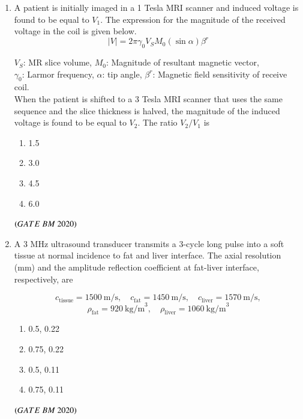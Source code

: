 \documentclass[journal,12pt,onecolumn]{IEEEtran}
\theoremstyle{remark}
\begin{document}
\begin{enumerate}
\item A patient is initially imaged in a 1 Tesla MRI scanner and induced voltage is found 
to be equal to $V_1$. The expression for the magnitude of the received voltage in the 
coil is given below.
\[
|V| = 2 \pi \gamma_0 V_S M_0 (\sin \alpha) \beta^r
\]
  
$V_S$: MR slice volume,
$M_0$: Magnitude of resultant magnetic vector,\\
$\gamma_0$: Larmor frequency,  
$\alpha$: tip angle,  
$\beta^r$: Magnetic field sensitivity of receive coil.  \\

When the patient is shifted to a 3 Tesla MRI scanner that uses the same sequence 
and the slice thickness is halved, the magnitude of the induced voltage is found 
to be equal to $V_2$. The ratio $V_2/V_1$ is
\begin{enumerate}[label=\alph*)] 
\item\hspace{0.5cm}1.5
\item\hspace{0.5cm}3.0
\item\hspace{0.5cm}4.5
\item\hspace{0.5cm}6.0
\end{enumerate}
 \hfill $\left(GATE\ BM\ 2020\right)$\\
 
\item A 3 MHz ultrasound transducer transmits a 3-cycle long pulse into a soft tissue at 
normal incidence to fat and liver interface. The axial resolution (mm) and the 
amplitude reflection coefficient at fat-liver interface, respectively, are

\[
c_{\text{tissue}} = 1500 \ \text{m/s}, \quad 
c_{\text{fat}} = 1450 \ \text{m/s}, \quad 
c_{\text{liver}} = 1570 \ \text{m/s},
\]
\[
\rho_{\text{fat}} = 920 \ \text{kg/m}^3, \quad 
\rho_{\text{liver}} = 1060 \ \text{kg/m}^3
\]

\begin{enumerate}[label=\alph*)] 
\item\hspace{0.5cm}0.5, 0.22
\item\hspace{0.5cm}0.75, 0.22
\item\hspace{0.5cm}0.5, 0.11
\item\hspace{0.5cm}0.75, 0.11
\end{enumerate}
 \hfill $\left(GATE\ BM\ 2020\right)$\\
 

\end{enumerate}
\end{document}
